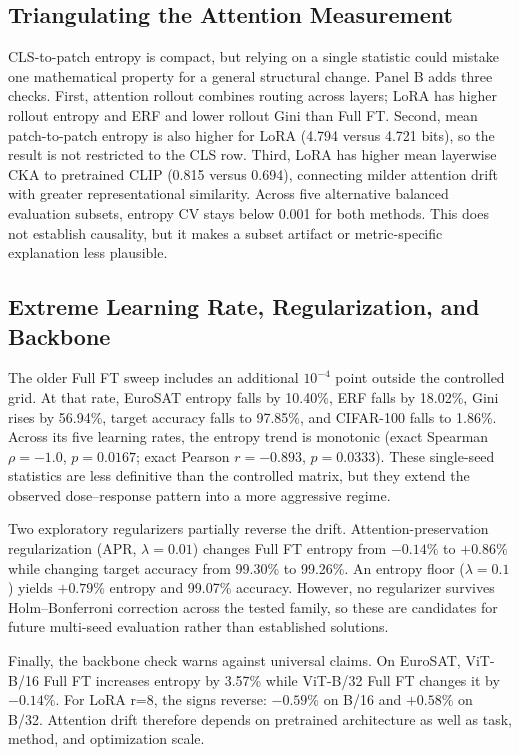 \documentclass[conference]{IEEEtran}
\begin{document}
\subsection{Triangulating the Attention Measurement}
CLS-to-patch entropy is compact, but relying on a single statistic could mistake one mathematical property for a general structural change. Panel B adds three checks. First, attention rollout \cite{abnar2020quantifying} combines routing across layers; LoRA has higher rollout entropy and ERF and lower rollout Gini than Full FT. Second, mean patch-to-patch entropy is also higher for LoRA (4.794 versus 4.721 bits), so the result is not restricted to the CLS row. Third, LoRA has higher mean layerwise CKA to pretrained CLIP (0.815 versus 0.694), connecting milder attention drift with greater representational similarity. Across five alternative balanced evaluation subsets, entropy CV stays below 0.001 for both methods. This does not establish causality, but it makes a subset artifact or metric-specific explanation less plausible.

\subsection{Extreme Learning Rate, Regularization, and Backbone}
The older Full FT sweep includes an additional $10^{-4}$ point outside the controlled grid. At that rate, EuroSAT entropy falls by 10.40\%, ERF falls by 18.02\%, Gini rises by 56.94\%, target accuracy falls to 97.85\%, and CIFAR-100 falls to 1.86\%. Across its five learning rates, the entropy trend is monotonic (exact Spearman $\rho=-1.0$, $p=0.0167$; exact Pearson $r=-0.893$, $p=0.0333$). These single-seed statistics are less definitive than the controlled matrix, but they extend the observed dose--response pattern into a more aggressive regime.

Two exploratory regularizers partially reverse the drift. Attention-preservation regularization (APR, $\lambda=0.01$) changes Full FT entropy from $-0.14\%$ to $+0.86\%$ while changing target accuracy from 99.30\% to 99.26\%. An entropy floor ($\lambda=0.1$) yields $+0.79\%$ entropy and 99.07\% accuracy. However, no regularizer survives Holm--Bonferroni correction across the tested family, so these are candidates for future multi-seed evaluation rather than established solutions.

Finally, the backbone check warns against universal claims. On EuroSAT, ViT-B/16 Full FT increases entropy by 3.57\% while ViT-B/32 Full FT changes it by $-0.14\%$. For LoRA r=8, the signs reverse: $-0.59\%$ on B/16 and $+0.58\%$ on B/32. Attention drift therefore depends on pretrained architecture as well as task, method, and optimization scale.
\end{document}
